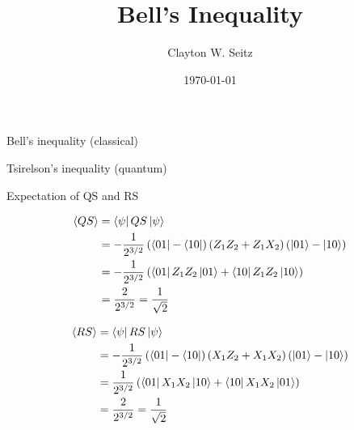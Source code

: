 \documentclass[aspectratio=1610]{beamer}					%
\title{Bell's Inequality}	%
\author{Clayton W. Seitz}								%
\date{\today}									%
\begin{document}
\begin{frame}
  \titlepage
\end{frame}

\begin{frame}{Bell's inequality (classical)}

\end{frame}

\begin{frame}{Tsirelson's inequality (quantum)}

\end{frame}

\begin{frame}{Expectation of QS and RS}

\begin{align*}
\langle QS \rangle &= \bra{\psi}QS\ket{\psi}\\
&= -\frac{1}{2^{3/2}}\left(\bra{01} - \bra{10}\right) \left(Z_{1}Z_{2}+Z_{1}X_{2}\right)\left(\ket{01} - \ket{10}\right)\\
&= -\frac{1}{2^{3/2}}\left(\bra{01}Z_{1}Z_{2}\ket{01} + \bra{10}Z_{1}Z_{2}\ket{10}\right)\\
&= \frac{2}{2^{3/2}} = \frac{1}{\sqrt{2}}
\end{align*}

\begin{align*}
\langle RS \rangle &= \bra{\psi}RS\ket{\psi}\\
&= -\frac{1}{2^{3/2}}\left(\bra{01} - \bra{10}\right) \left(X_{1}Z_{2}+X_{1}X_{2}\right)\left(\ket{01} - \ket{10}\right)\\
&= \frac{1}{2^{3/2}}\left(\bra{01}X_{1}X_{2}\ket{10} + \bra{10}X_{1}X_{2}\ket{01}\right)\\
&= \frac{2}{2^{3/2}} = \frac{1}{\sqrt{2}}
\end{align*}

\end{frame}
\end{document}
